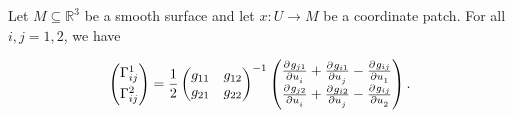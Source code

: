 \begin{lemma}
	Let $M \subseteq \mathbb{R}^3$ be a smooth surface and let $x: U \to M$ be a coordinate patch. For all $i,j = 1,2$, we have 

	\begin{equation}
		\begin{pmatrix}
			\Gamma^1_{ij}\\[3pt]
			\Gamma^2_{ij}
		\end{pmatrix}
		= \frac{1}{2}\begin{pmatrix}
			g_{11} & g_{12}\\
			g_{21} & g_{22}
		\end{pmatrix}^{-1}
		\begin{pmatrix}
			\pd{g_{j1}}{u_i} + \pd{g_{i1}}{u_j} - \pd{g_{ij}}{u_1}\\
			\pd{g_{j2}}{u_i} + \pd{g_{i2}}{u_j} - \pd{g_{ij}}{u_2}
		\end{pmatrix}.
	\end{equation}
\end{lemma}

